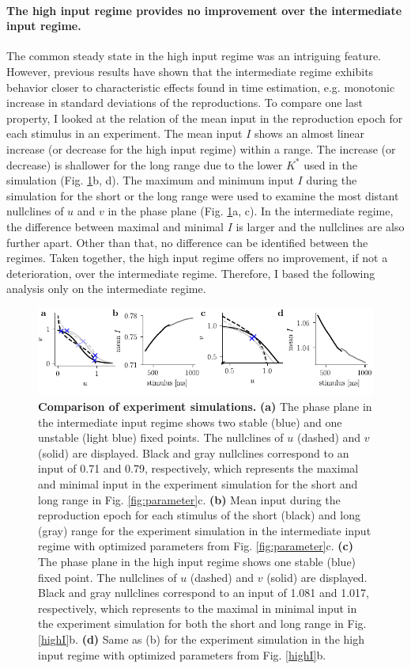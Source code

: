 \documentclass[10pt, a4paper]{article}
\begin{document}
\paragraph{The high input regime provides no improvement over the intermediate input regime.}
The common steady state in the high input regime was an intriguing feature.
However, previous results have shown that the intermediate regime exhibits behavior closer to characteristic effects found in time estimation, e.g. monotonic increase in standard deviations of the reproductions. 
To compare one last property, I looked at the relation of the mean input in the reproduction epoch for each stimulus in an experiment.
The mean input $I$ shows an almost linear increase (or decrease for the high input regime) within a range. The increase (or decrease) is shallower for the long range due to the lower $K^*$ used in the simulation (Fig. \ref{fig:comparison}b, d).
The maximum and minimum input $I$ during the simulation for the short or the long range were used to examine the most distant nullclines of $u$ and $v$ in the phase plane (Fig. \ref{fig:comparison}a, c). 
In the intermediate regime, the difference between maximal and minimal $I$ is larger and the nullclines are also further apart. Other than that, no difference can be identified between the regimes. 
Taken together, the high input regime offers no improvement, if not a deterioration, over the intermediate regime. Therefore, I based the following analysis only on the intermediate regime. 

\begin{figure}[!htb]
	\centering
	\includegraphics{figures/supp_comparison.pdf}
	\caption{\textbf{Comparison of experiment simulations.}
	\textbf{(a)} The phase plane in the intermediate input regime shows two stable (blue) and one unstable (light blue) fixed points. The nullclines of $u$ (dashed) and $v$ (solid) are displayed. Black and gray nullclines correspond to an input of 0.71 and 0.79, respectively, which represents the maximal and minimal input in the experiment simulation for the short and long range in Fig. \ref{fig:parameter}c.
	\textbf{(b)} Mean input during the reproduction epoch for each stimulus of the short (black) and long (gray) range for the experiment simulation in the intermediate input regime with optimized parameters from Fig. \ref{fig:parameter}c.
	\textbf{(c)} The phase plane in the high input regime shows one stable (blue) fixed point. The nullclines of $u$ (dashed) and $v$ (solid) are displayed. Black and gray nullclines correspond to an input of 1.081 and 1.017, respectively, which represents to the maximal in minimal input in the experiment simulation for both the short and long range in Fig. \ref{highI}b.
	\textbf{(d)} Same as (b) for the experiment simulation in the high input regime with optimized parameters from Fig. \ref{highI}b.
	}
\label{fig:comparison}
\end{figure}
\end{document}
